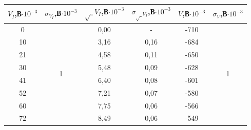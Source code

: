 \documentclass[a4paper,12pt]{report}
\begin{document}
\begin{table}[H]
\begin{tabular}{|c|c|c|c|c|c|}
\hline
$V_{I}$,В$\cdot10^{-3}$ & $\sigma_{V_I}$,В$\cdot10^{-3}$ & $\sqrt_{V_I}$,В$\cdot10^{-3}$ & $\sigma_{\sqrt_{V_I}}$,В$\cdot10^{-3}$ & $V$,В$\cdot10^{-3}$ & $\sigma_{V}$,В$\cdot10^{-3}$ \\ \hline
0                             & \multirow{15}{*}{1}                   & 0,00                              & -                                 & -710                         & \multirow{15}{*}{1}                  \\ \cline{1-1} \cline{3-5}
10                            &                                       & 3,16                              & 0,16                              & -684                         &                                      \\ \cline{1-1} \cline{3-5}
21                            &                                       & 4,58                              & 0,11                              & -650                         &                                      \\ \cline{1-1} \cline{3-5}
30                            &                                       & 5,48                              & 0,09                              & -628                         &                                      \\ \cline{1-1} \cline{3-5}
41                            &                                       & 6,40                              & 0,08                              & -601                         &                                      \\ \cline{1-1} \cline{3-5}
52                            &                                       & 7,21                              & 0,07                              & -580                         &                                      \\ \cline{1-1} \cline{3-5}
60                            &                                       & 7,75                              & 0,06                              & -566                         &                                      \\ \cline{1-1} \cline{3-5}
72                            &                                       & 8,49                              & 0,06                              & -549                         &                                      \\ \cline{1-1} \cline{3-5}

\end{tabular}
\end{table}
\end{document}

